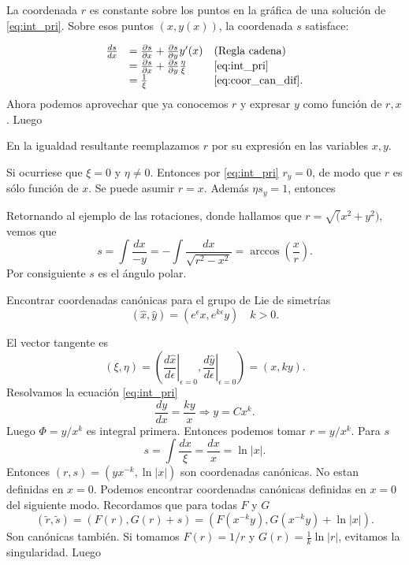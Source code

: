 La coordenada $r$ es constante sobre los puntos en la gráfica de una solución de \eqref{eq:int_pri}. Sobre esos puntos $(x,y(x))$, la coordenada $s$ satisface:

\begin{equation} \label{eq:coor_can_s}
\begin{array}{lll}
\frac{ds}{dx}&=\frac{\partial s}{\partial x}+\frac{\partial s}{\partial y} y'(x) & \hbox{(Regla cadena)}\\
&=\frac{\partial s}{\partial x}+\frac{\partial s}{\partial y} \frac{\eta}{\xi} &
  \eqref{eq:int_pri}\\
&=\frac{1}{\xi} &\hbox{\eqref{eq:coor_can_dif}}.
\end{array}
\end{equation}
Ahora podemos aprovechar que ya conocemos $r$ y  expresar $y$ como función de $r,x$. Luego

\begin{teorema}
\end{teorema}
 

En la igualdad resultante  reemplazamos $r$ por su expresión en las variables $x,y$.


Si ocurriese que $\xi=0$ y $\eta\neq 0$. Entonces por \eqref{eq:int_pri} $r_y=0$, de modo que $r$ es sólo función de $x$. Se puede asumir $r=x$. Además $\eta s_y=1$, entonces


\begin{ejemplo} Retornando al ejemplo de las rotaciones, donde hallamos que $r=\sqrt(x^2+y^2)$, vemos que
\[s=\int\frac{dx}{-y}=-\int\frac{dx}{\sqrt{r^2-x^2}}=\arccos\left(\frac{x}{r}\right).\]
Por consiguiente  $s$ es el ángulo polar.
\end{ejemplo}


\label{pag_ejem_canon1}
\begin{ejemplo} Encontrar coordenadas canónicas para el grupo de Lie de simetrías
\[(\hat{x},\hat{y})=(e^{\epsilon}x,e^{k\epsilon}y)\quad k>0.\]
\end{ejemplo}
El vector tangente es
\[(\xi,\eta)=\left(\left.\frac{d\hat{x}}{d\epsilon}\right|_{\epsilon=0},\left.\frac{d\hat{y}}{d\epsilon}\right|_{\epsilon=0}\right)=(x,ky).\]
Resolvamos la ecuación  \eqref{eq:int_pri} 
\[\frac{dy}{dx}=\frac{ky}{x}\Rightarrow y=Cx^k.\]
Luego $\Phi=y/x^k$ es integral primera. Entonces podemos tomar $r=y/x^k$.  Para $s$
\label{pag_ejem_canon2}
\[s=\int\frac{dx}{\xi}=\frac{dx}{x}=\ln|x|.\]
Entonces $(r,s)=(yx^{-k},\ln|x|)$ son coordenadas canónicas. No estan definidas en $x=0$.
Podemos encontrar coordenadas canónicas definidas en $x=0$ del siguiente modo. Recordamos que para todas $F$ y $G$
\[(\tilde{r},\tilde{s})=(F(r),G(r)+s)=(F(x^{-k}y),G(x^{-k}y)+\ln|x|).\]
Son canónicas también. Si tomamos $F(r)=1/r$ y $G(r)=\frac{1}{k}\ln|r|$, evitamos la singularidad. Luego

